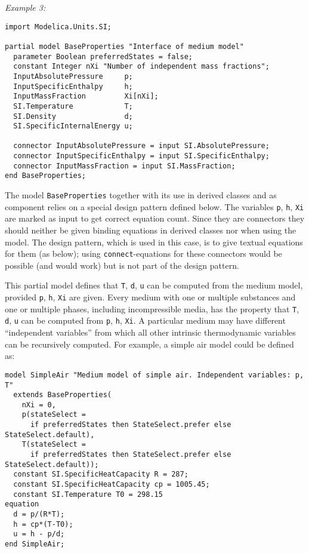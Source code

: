 \begin{example}
\emph{Example 3:}
\begin{lstlisting}[language=modelica]
import Modelica.Units.SI;

partial model BaseProperties "Interface of medium model"
  parameter Boolean preferredStates = false;
  constant Integer nXi "Number of independent mass fractions";
  InputAbsolutePressure     p;
  InputSpecificEnthalpy     h;
  InputMassFraction         Xi[nXi];
  SI.Temperature            T;
  SI.Density                d;
  SI.SpecificInternalEnergy u;

  connector InputAbsolutePressure = input SI.AbsolutePressure;
  connector InputSpecificEnthalpy = input SI.SpecificEnthalpy;
  connector InputMassFraction = input SI.MassFraction;
end BaseProperties;
\end{lstlisting}

The model \lstinline!BaseProperties! together with its use in derived classes and as component relies on a special design pattern defined below.
The variables \lstinline!p!, \lstinline!h!, \lstinline!Xi! are marked as input to get correct equation count.
Since they are connectors they should neither be given binding equations in derived classes nor when using the model.
The design pattern, which is used in this case, is to give textual equations for them (as below); using \lstinline!connect!-equations for these connectors would be possible (and would work) but is not part of the design pattern.

This partial model defines that \lstinline!T!, \lstinline!d!, \lstinline!u! can be computed from
the medium model, provided \lstinline!p!, \lstinline!h!, \lstinline!Xi! are given.  Every medium with
one or multiple substances and one or multiple phases, including
incompressible media, has the property that \lstinline!T!, \lstinline!d!, \lstinline!u! can be computed
from \lstinline!p!, \lstinline!h!, \lstinline!Xi!. A particular medium may have different ``independent
variables'' from which all other intrinsic thermodynamic variables can
be recursively computed. For example, a simple air model could be
defined as:
\begin{lstlisting}[language=modelica]
model SimpleAir "Medium model of simple air. Independent variables: p, T"
  extends BaseProperties(
    nXi = 0,
    p(stateSelect =
      if preferredStates then StateSelect.prefer else StateSelect.default),
    T(stateSelect =
      if preferredStates then StateSelect.prefer else StateSelect.default));
  constant SI.SpecificHeatCapacity R = 287;
  constant SI.SpecificHeatCapacity cp = 1005.45;
  constant SI.Temperature T0 = 298.15
equation
  d = p/(R*T);
  h = cp*(T-T0);
  u = h - p/d;
end SimpleAir;
\end{lstlisting}


\end{example}
